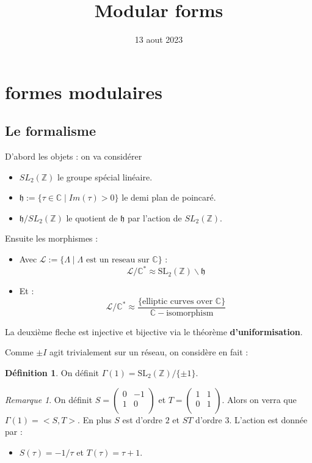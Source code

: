 \documentclass[12pt]{article}
\title{Modular forms}
\date{13 aout 2023}
\theoremstyle{plain}
\theoremstyle{definition}
\newtheorem{defn}[subsubsection]{D\'efinition}
\theoremstyle{remark}
\newtheorem{rem}{Remarque}
\newcommand{\Z}{\mathbb{Z}}
\newcommand{\C}{\mathbb{C}}
\newcommand{\h}{\mathfrak{h}}
\newcommand{\La}{\mathcal{L}}
\begin{document}
\maketitle
\tableofcontents

\section{formes modulaires}
 
\subsection{Le formalisme}
D'abord les objets : on va considérer 
\begin{itemize}
    \item $SL_2(\Z)$ le groupe spécial linéaire.
    \item $\h:=\{\tau\in\C\mid Im(\tau)>0\}$ le demi plan de poincaré.
    \item $\h/SL_2(\Z)$ le quotient de $\h$ par l'action de $SL_2(\Z)$.
\end{itemize}

Ensuite les morphismes :
\begin{itemize}
    \item Avec $\La :=\{\Lambda\mid \Lambda\text{ est un reseau sur }\C\}$ : $$\La/\C^*\approx \text{SL}_2(\Z)\backslash\h$$
    \item Et : $$\La/\C^*\approx \frac{\{\text{elliptic curves over }\C\}}{\C-\text{isomorphism}}$$
\end{itemize}
La deuxième fleche est injective et bijective via le théorème \textbf{d'uniformisation}.
\newpage

Comme $\pm I$ agit trivialement sur un réseau, on considère en fait :
\begin{defn}
    On définit $\Gamma(1) = \text{SL}_2(\Z)/\{\pm 1\}$.
\end{defn}

\begin{rem}
    On définit $S=\begin{pmatrix} 0 & -1\\ 1 & 0\\ \end{pmatrix}$ et $T=\begin{pmatrix} 1 & 1\\ 0 & 1\\ \end{pmatrix}$. Alors on verra que
    $\Gamma(1)=<S,T>$. En plus $S$ est d'ordre $2$ et $ST$ d'ordre $3$. L'action est donnée par :
    \begin{itemize}
        \item $S(\tau)=-1/\tau$ et $T(\tau)=\tau+1$.
    \end{itemize}
\end{rem}
\end{document}
